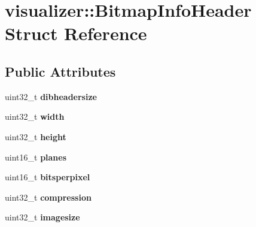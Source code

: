 \hypertarget{structvisualizer_1_1_bitmap_info_header}{}\section{visualizer\+:\+:Bitmap\+Info\+Header Struct Reference}
\label{structvisualizer_1_1_bitmap_info_header}
\subsection*{Public Attributes}
\begin{DoxyCompactItemize}
\item 
\mbox{\label{structvisualizer_1_1_bitmap_info_header_aa948614dcf785eb73fc5f8e6d167cffe}} 
uint32\+\_\+t {\bfseries dibheadersize}
\item 
\mbox{\label{structvisualizer_1_1_bitmap_info_header_adbdbe8eb51d35287f34011bb807e2cc9}} 
uint32\+\_\+t {\bfseries width}
\item 
\mbox{\label{structvisualizer_1_1_bitmap_info_header_a690035c63f73bca8e8f7dec8c34e57eb}} 
uint32\+\_\+t {\bfseries height}
\item 
\mbox{\label{structvisualizer_1_1_bitmap_info_header_a388f28427be89d01501baf6684334279}} 
uint16\+\_\+t {\bfseries planes}
\item 
\mbox{\label{structvisualizer_1_1_bitmap_info_header_aae99ff5c9e392f5b9071e71e96214037}} 
uint16\+\_\+t {\bfseries bitsperpixel}
\item 
\mbox{\label{structvisualizer_1_1_bitmap_info_header_a96381aa9deebf9a89a47ccf84e686b17}} 
uint32\+\_\+t {\bfseries compression}
\item 
\mbox{\label{structvisualizer_1_1_bitmap_info_header_a5f8c0e9eae60a612efb52b33cd52e3e1}} 
uint32\+\_\+t {\bfseries imagesize}
\item 
\mbox{\label{structvisualizer_1_1_bitmap_info_header_a5cc22a4fff1707a47ae60b2ac1f6be53}} 

\end{DoxyCompactItemize}
